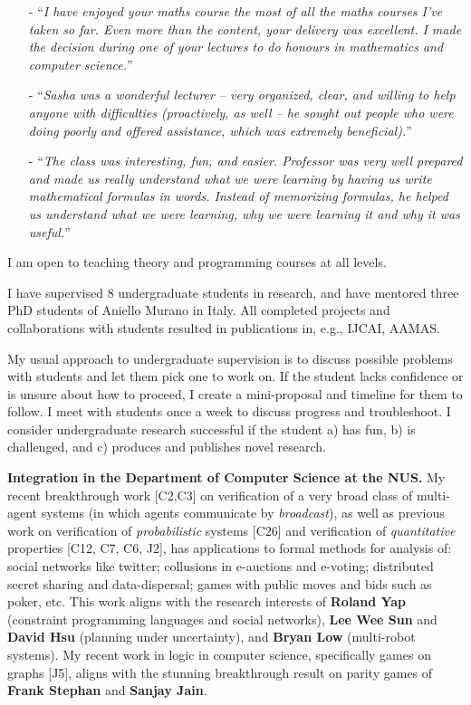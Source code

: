 \documentclass[10,a4paper,sans]{moderncv}
\begin{document}
\begin{itemize}
\item[-] ``\emph{I have enjoyed your maths course the most of all the maths courses I've taken so far. Even more than the content, your delivery was excellent.
I made the decision during one of your lectures to do honours in mathematics and computer science.}''

\item[-] ``\emph{Sasha was a wonderful lecturer -- very organized, clear, and willing to help anyone with difficulties (proactively, as well -- he sought out people who were doing poorly and offered assistance, which was extremely beneficial).}''

\item[-] ``\emph{The class was interesting, fun, and easier. Professor was very well prepared and made us really understand what we were learning by having us write mathematical formulas in words. Instead of memorizing formulas, he helped us understand what we were learning, why we were learning it and why it was useful.}''
\end{itemize}

I am open to teaching theory and programming courses at all levels. 


I have supervised 8 undergraduate students in research, and have mentored three PhD students of Aniello Murano in Italy. All completed projects and collaborations with students resulted in publications in, e.g., IJCAI, AAMAS.

My usual approach to undergraduate supervision is to discuss possible problems with students and let them pick one to work on. 
If the student lacks confidence or is unsure about how to proceed, I create a mini-proposal and timeline for them to follow. I meet with students once a week to discuss progress and troubleshoot. I consider undergraduate research successful if the student a) has fun, b) is challenged, and c) produces and publishes novel research.


\textbf{Integration in the Department of Computer Science at the NUS.}
My recent breakthrough work [C2,C3] on verification of a very broad class of multi-agent systems (in which agents communicate by \emph{broadcast}), as well as previous work on verification of \emph{probabilistic} systems [C26] and verification of \emph{quantitative} properties [C12, C7, C6, J2], has applications to formal methods for analysis of: social networks like twitter; collusions in e-auctions and e-voting; distributed secret sharing and data-dispersal; games with public moves and bids such as poker, etc. This work aligns with the research interests of \textbf{Roland Yap} (constraint programming languages and social networks), \textbf{Lee Wee Sun} and \textbf{David Hsu} (planning under uncertainty), and \textbf{Bryan Low} (multi-robot systems).
My recent work in logic in computer science, specifically games on graphs [J5], aligns with the stunning breakthrough result on parity games 
of \textbf{Frank Stephan} and \textbf{Sanjay Jain}.
\end{document}
